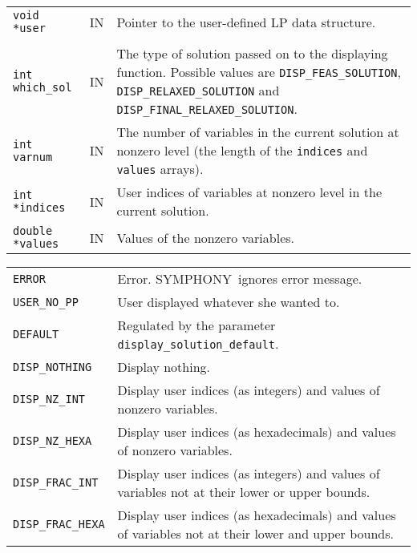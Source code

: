 \documentclass[twoside,11pt]{article}
\begin{document}
{\newpage
\clearpage
\samepage \begin{tabular}{llp{290pt}}
{\tt void *user} & IN & Pointer to the user-defined LP data structure.\\ 
& & \\ 
{\tt int which\_sol} & IN & The type of solution passed on to the
displaying function. Possible values are {\tt DISP\_FEAS\_SOLUTION},
{\tt DISP\_RELAXED\_SOLUTION} and {\tt DISP\_FINAL\_RELAXED\_SOLUTION}. \\ 
{\tt int varnum} & IN & The number of variables in the current
solution at nonzero level (the length of the {\tt indices} and {\tt
values} arrays). \\ 
{\tt int *indices} & IN & User indices of variables at
nonzero level in the current solution.\\ 
{\tt double *values} & IN & Values of the nonzero variables.\\ 
\end{tabular}
}

{\newpage
\clearpage
\samepage \begin{tabular}{lp{317pt}}
{\tt ERROR} & Error. {\sc SYMPHONY}\ ignores error message. \\ 
{\tt USER\_NO\_PP} & User displayed whatever she wanted to.\\ 
{\tt DEFAULT} & Regulated by the parameter {\tt display\_solution\_default}. \\ 
{\tt DISP\_NOTHING} & Display nothing. \\ 
{\tt DISP\_NZ\_INT} & Display user indices (as integers) and values of
nonzero variables. \\ 
{\tt DISP\_NZ\_HEXA} & Display user indices (as hexadecimals) and
values of nonzero variables. \\ 
{\tt DISP\_FRAC\_INT} & Display user indices (as integers) and values
of variables not at their lower or upper bounds. \\ 
{\tt DISP\_FRAC\_HEXA} & Display user indices (as hexadecimals) and
values of variables not at their lower and upper bounds. \\ 
\end{tabular}
}
\end{document}
